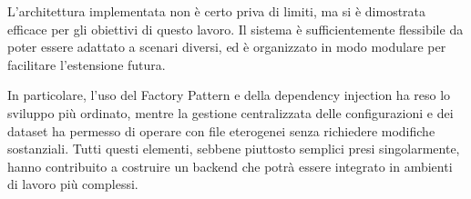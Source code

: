 L'architettura implementata non è certo priva di limiti, ma si è dimostrata
efficace per gli obiettivi di questo lavoro. Il sistema è sufficientemente flessibile
da poter essere adattato a scenari diversi, ed è organizzato in modo modulare
per facilitare l'estensione futura.

In particolare, l'uso del Factory Pattern e della dependency injection ha reso lo
sviluppo più ordinato, mentre la gestione centralizzata delle configurazioni e
dei dataset ha permesso di operare con file eterogenei senza richiedere
modifiche sostanziali. Tutti questi elementi, sebbene piuttosto semplici presi
singolarmente, hanno contribuito a costruire un backend che potrà essere integrato
in ambienti di lavoro più complessi.
